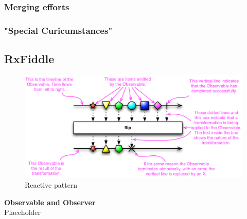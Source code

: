 	\subsubsection{Merging efforts}
	\subsubsection{"Special Curicumstances"}
	

\subsection{RxFiddle}



\begin{figure}[!h]
	\centering
	\includegraphics[scale=0.5,trim=0 0 0 0]{gfx/rxjs-reactive-pattern2.png}
	\caption{Reactive pattern \protect\cite{ReactiveXobservable}}
	\label{fig:rxjs-reactive-pattern}
\end{figure}

\textbf{Observable and Observer}\\
Placeholder


